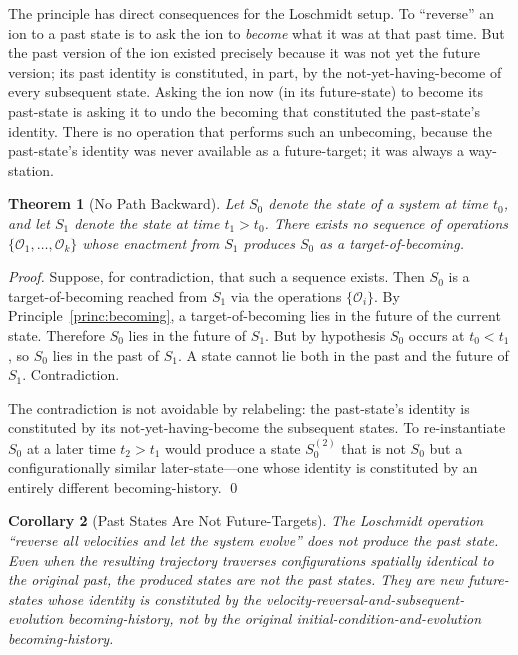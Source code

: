 \documentclass[twocolumn,10pt,a4paper]{article}
\newtheorem{theorem}{Theorem}[section]
\newtheorem{corollary}[theorem]{Corollary}
\theoremstyle{definition}
\theoremstyle{remark}
\newcommand{\Operation}{\mathcal{O}}
\begin{document}
The principle has direct consequences for the Loschmidt setup. To ``reverse'' an ion to a past state is to ask the ion to \emph{become} what it was at that past time. But the past version of the ion existed precisely because it was not yet the future version; its past identity is constituted, in part, by the not-yet-having-become of every subsequent state. Asking the ion now (in its future-state) to become its past-state is asking it to undo the becoming that constituted the past-state's identity. There is no operation that performs such an unbecoming, because the past-state's identity was never available as a future-target; it was always a way-station.

\begin{theorem}[No Path Backward]
\label{thm:no-path-backward}
Let $S_0$ denote the state of a system at time $t_0$, and let $S_1$ denote the state at time $t_1 > t_0$. There exists no sequence of operations $\{\Operation_1, \ldots, \Operation_k\}$ whose enactment from $S_1$ produces $S_0$ as a target-of-becoming.
\end{theorem}

\begin{proof}
Suppose, for contradiction, that such a sequence exists. Then $S_0$ is a target-of-becoming reached from $S_1$ via the operations $\{\Operation_i\}$. By Principle~\ref{princ:becoming}, a target-of-becoming lies in the future of the current state. Therefore $S_0$ lies in the future of $S_1$. But by hypothesis $S_0$ occurs at $t_0 < t_1$, so $S_0$ lies in the past of $S_1$. A state cannot lie both in the past and the future of $S_1$. Contradiction.

The contradiction is not avoidable by relabeling: the past-state's identity is constituted by its not-yet-having-become the subsequent states. To re-instantiate $S_0$ at a later time $t_2 > t_1$ would produce a state $S_0^{(2)}$ that is not $S_0$ but a configurationally similar later-state---one whose identity is constituted by an entirely different becoming-history. \qed
\end{proof}

\begin{corollary}[Past States Are Not Future-Targets]
\label{cor:past-not-future}
The Loschmidt operation ``reverse all velocities and let the system evolve'' does not produce the past state. Even when the resulting trajectory traverses configurations spatially identical to the original past, the produced states are not the past states. They are new future-states whose identity is constituted by the velocity-reversal-and-subsequent-evolution becoming-history, not by the original initial-condition-and-evolution becoming-history.
\end{corollary}
\end{document}
